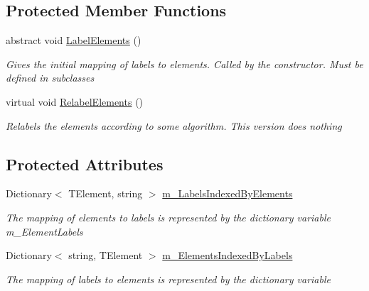 \subsection*{Protected Member Functions}
\begin{DoxyCompactItemize}
\item 
abstract void \hyperlink{class_graph_library_1_1_generics_1_1_abstract_graph_labeling_a890775a0a91077bedd4330df8ddafe48}{Label\+Elements} ()
\begin{DoxyCompactList}\small\item\em Gives the initial mapping of labels to elements. Called by the constructor. Must be defined in subclasses \end{DoxyCompactList}\item 
virtual void \hyperlink{class_graph_library_1_1_generics_1_1_abstract_graph_labeling_a210863207176996b133a6d6c34d1c4a0}{Relabel\+Elements} ()
\begin{DoxyCompactList}\small\item\em Relabels the elements according to some algorithm. This version does nothing \end{DoxyCompactList}\end{DoxyCompactItemize}
\subsection*{Protected Attributes}
\begin{DoxyCompactItemize}
\item 
Dictionary$<$ T\+Element, string $>$ \hyperlink{class_graph_library_1_1_generics_1_1_abstract_graph_labeling_a6da5ad0ff86fe7cb0a33a0bf7ca9d27d}{m\+\_\+\+Labels\+Indexed\+By\+Elements}
\begin{DoxyCompactList}\small\item\em The mapping of elements to labels is represented by the dictionary variable m\+\_\+\+Element\+Labels \end{DoxyCompactList}\item 
Dictionary$<$ string, T\+Element $>$ \hyperlink{class_graph_library_1_1_generics_1_1_abstract_graph_labeling_a761265974897ab4d557e5896ab6df595}{m\+\_\+\+Elements\+Indexed\+By\+Labels}
\begin{DoxyCompactList}\small\item\em The mapping of labels to elements is represented by the dictionary variable \end{DoxyCompactList}\end{DoxyCompactItemize}


